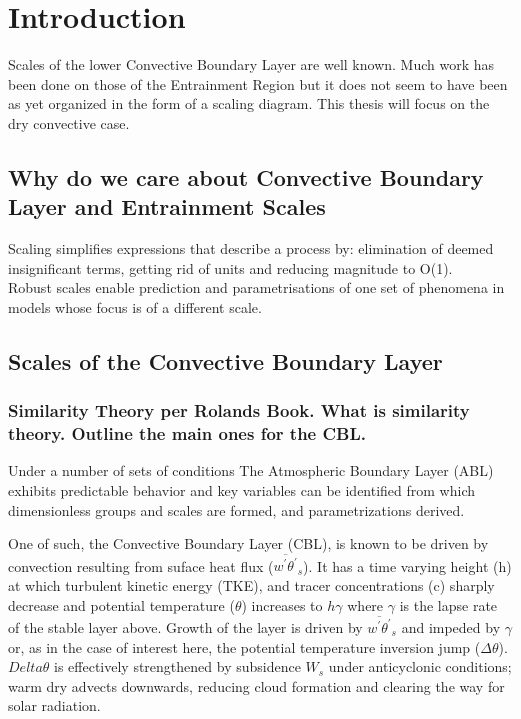
\chapter{Introduction}
\label{ch:Introduction}
\setlength{\parindent}{0cm}
Scales of the lower Convective Boundary Layer are well known.  Much work has been done on those of the Entrainment Region but it does not seem to have been as yet organized in the form of a scaling diagram. This thesis will focus on the dry convective case.  

\section{Why do we care about Convective Boundary Layer and Entrainment Scales}
\label{sec:WhydowecareaboutConvectiveBoundaryLayerScales}

Scaling simplifies expressions that describe a process by: elimination of deemed insignificant terms, 
getting rid of units and reducing magnitude to O(1).\\

Robust scales enable prediction and parametrisations of one set of phenomena in models whose focus is
of a different scale.\\


\section{Scales of the Convective Boundary Layer}
\label{sec:ScalesoftheConnvectiveBoundaryLayer}

\subsection{Similarity Theory per Rolands Book.  What is similarity theory.  Outline the main ones for the CBL.} 

Under a number of sets of conditions The Atmospheric Boundary Layer (ABL) exhibits predictable behavior
and key variables can be identified from which dimensionless groups and scales are formed, 
and parametrizations derived.
 
One of such, the Convective Boundary Layer (CBL), is known to be driven by convection resulting from 
suface heat flux ($\overline{w^{'}\theta^{'}}_{s}$).  It has a time varying height (h) at which turbulent
kinetic energy (TKE), and tracer concentrations (c) sharply decrease and potential temperature ($\theta$)
increases to $h \gamma$ where $\gamma$ is the lapse rate of the stable layer above.  Growth of the layer
is driven by $\overline{w^{'}\theta^{'}}_{s}$ and impeded by $\gamma$ or, as in the case of interest here,
the potential temperature inversion jump ($\Delta \theta$).  $Delta \theta$ is effectively strengthened
by subsidence $W_{s}$ under anticyclonic conditions; warm dry advects downwards, reducing cloud formation
and clearing the way for solar radiation.\\
 
